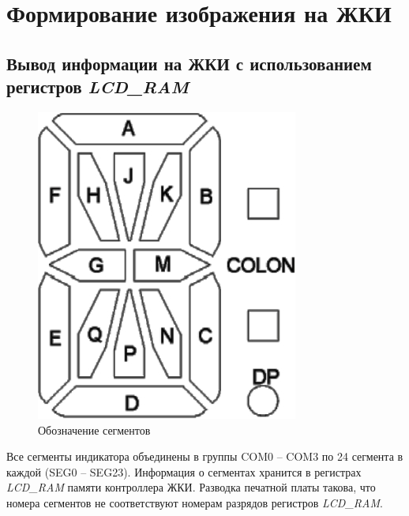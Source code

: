 \section{Формирование изображения на ЖКИ}



\subsection{Вывод информации на ЖКИ с использованием регистров \textit{LCD\_RAM}}
\begin{figure}[H]
\begin{center}
\includegraphics[scale=0.4]{Image/52.jpg} 
\end{center}
\caption{Обозначение сегментов}
\end{figure}
Все сегменты индикатора объединены в группы COM0 -- COM3 по 24 сегмента в каждой (SEG0 -- SEG23). Информация о сегментах хранится в регистрах \textit{LCD\_RAM} памяти контроллера ЖКИ. Разводка печатной платы такова, что номера сегментов не соответствуют номерам разрядов регистров \textit{LCD\_RAM}.

